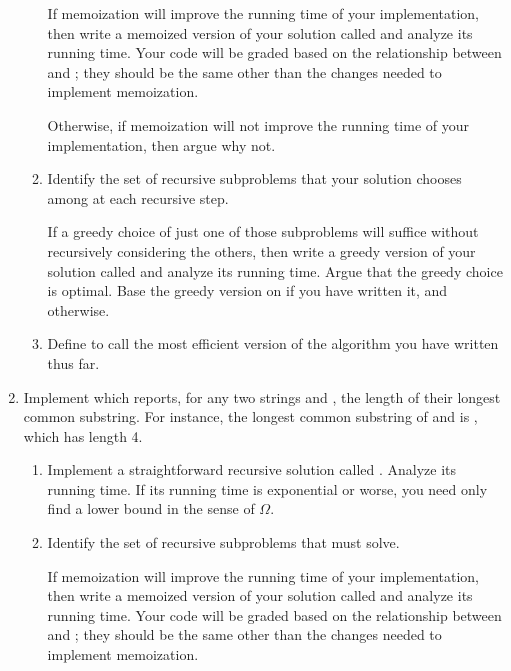 \documentclass{article}
\begin{document}
\begin{enumerate}
\begin{enumerate}
      If memoization will improve the running time of your implementation, then
      write a memoized version of your solution called
       and analyze its running time.  Your code will
      be graded based on the relationship between  and
      ; they should be the same other than the
      changes needed to implement memoization.

      Otherwise, if memoization will not improve the running time of your
      implementation, then argue why not.

    \item Identify the set of recursive subproblems that your solution chooses
      among at each recursive step.

      If a greedy choice of just one of those subproblems will suffice without
      recursively considering the others, then write a greedy version of your
      solution called  and analyze its running time.
      Argue that the greedy choice is optimal.  Base the greedy version on
       if you have written it, and
       otherwise.

    \item Define  to call the most efficient version of the
      algorithm you have written thus far.

    \end{enumerate}

  \newpage
  \item Implement  which reports, for any two strings
     and , the length of their longest common substring.
    For instance, the longest common substring of  and
     is , which has length 4.

    \begin{enumerate}

    \item Implement a straightforward recursive solution called
      .  Analyze its running time.  If its running
      time is exponential or worse, you need only find a lower bound in the
      sense of \(\Omega\).

    \item Identify the set of recursive subproblems that
       must solve.

      If memoization will improve the running time of your implementation, then
      write a memoized version of your solution called
       and analyze its running time.  Your code will
      be graded based on the relationship between  and
      ; they should be the same other than the
      changes needed to implement memoization.


\end{enumerate}
\end{enumerate}
\end{document}
